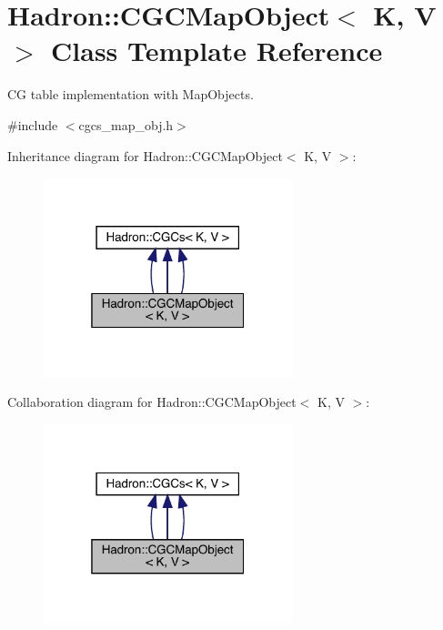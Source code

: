 \hypertarget{classHadron_1_1CGCMapObject}{}\section{Hadron\+:\+:C\+G\+C\+Map\+Object$<$ K, V $>$ Class Template Reference}
\label{classHadron_1_1CGCMapObject}


CG table implementation with Map\+Objects.  




{\ttfamily \#include $<$cgcs\+\_\+map\+\_\+obj.\+h$>$}



Inheritance diagram for Hadron\+:\+:C\+G\+C\+Map\+Object$<$ K, V $>$\+:
\nopagebreak
\begin{figure}[H]
\begin{center}
\leavevmode
\includegraphics[width=205pt]{d6/d01/classHadron_1_1CGCMapObject__inherit__graph}
\end{center}
\end{figure}


Collaboration diagram for Hadron\+:\+:C\+G\+C\+Map\+Object$<$ K, V $>$\+:
\nopagebreak
\begin{figure}[H]
\begin{center}
\leavevmode
\includegraphics[width=205pt]{d9/dd5/classHadron_1_1CGCMapObject__coll__graph}
\end{center}
\end{figure}
